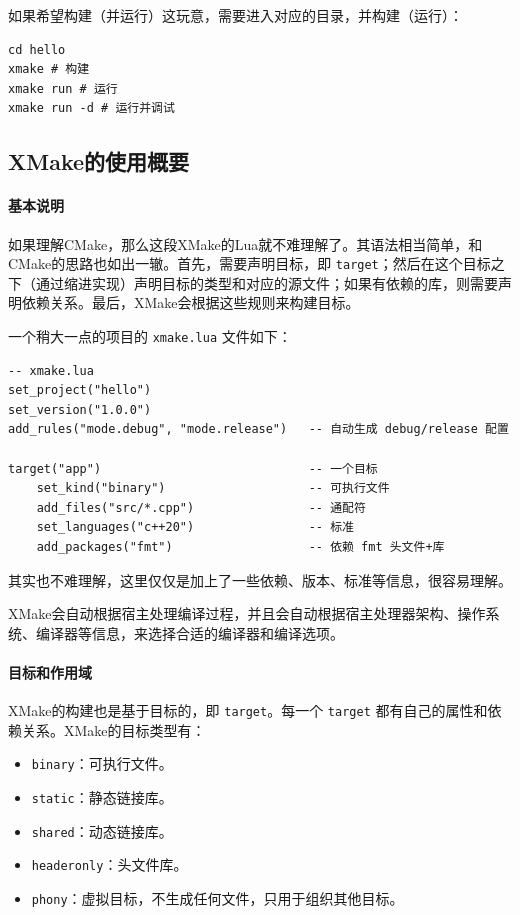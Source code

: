 如果希望构建（并运行）这玩意，需要进入对应的目录，并构建（运行）：
\begin{verbatim}
cd hello
xmake # 构建
xmake run # 运行
xmake run -d # 运行并调试
\end{verbatim}

\subsection{XMake的使用概要}

\paragraph{基本说明}

如果理解CMake，那么这段XMake的Lua就不难理解了。其语法相当简单，和CMake的思路也如出一辙。首先，需要声明目标，即 \verb|target|；然后在这个目标之下（通过缩进实现）声明目标的类型和对应的源文件；如果有依赖的库，则需要声明依赖关系。最后，XMake会根据这些规则来构建目标。

一个稍大一点的项目的 \verb|xmake.lua| 文件如下：

\begin{verbatim}
-- xmake.lua
set_project("hello")
set_version("1.0.0")
add_rules("mode.debug", "mode.release")   -- 自动生成 debug/release 配置

target("app")                             -- 一个目标
    set_kind("binary")                    -- 可执行文件
    add_files("src/*.cpp")                -- 通配符
    set_languages("c++20")                -- 标准
    add_packages("fmt")                   -- 依赖 fmt 头文件+库
\end{verbatim}
其实也不难理解，这里仅仅是加上了一些依赖、版本、标准等信息，很容易理解。

XMake会自动根据宿主处理编译过程，并且会自动根据宿主处理器架构、操作系统、编译器等信息，来选择合适的编译器和编译选项。

\paragraph{目标和作用域}

XMake的构建也是基于目标的，即 \verb|target|。每一个 \verb|target| 都有自己的属性和依赖关系。XMake的目标类型有：
\begin{itemize}
    \item \verb|binary|：可执行文件。
    \item \verb|static|：静态链接库。
    \item \verb|shared|：动态链接库。
    \item \verb|headeronly|：头文件库。
    \item \verb|phony|：虚拟目标，不生成任何文件，只用于组织其他目标。
\end{itemize}


